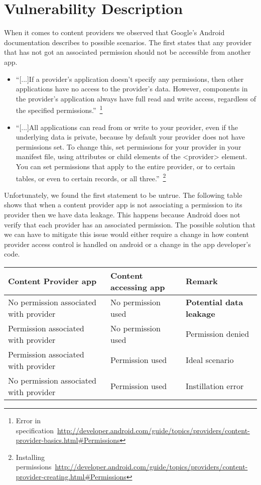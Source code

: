 \section{Vulnerability Description}
\label{vuln}
When it comes to content providers we observed that Google's Android documentation describes to possible scenarios. The first states that any provider that has not got an associated permission should not be accessible from another app.
\begin{itemize}
	\item ``[...]If a provider's application doesn't specify any permissions, then other applications have no access to the provider's data. However, components in the provider's application always have full read and write access, regardless of the specified permissions.''~\footnote{Error in specification~\url{http://developer.android.com/guide/topics/providers/content-provider-basics.html#Permissions}}
	\item ``[...]All applications can read from or write to your provider, even if the underlying data is private, because by default your provider does not have permissions set. To change this, set permissions for your provider in your manifest file, using attributes or child elements of the <provider> element. You can set permissions that apply to the entire provider, or to certain tables, or even to certain records, or all three.''~\footnote{Installing permissions~\url{http://developer.android.com/guide/topics/providers/content-provider-creating.html#Permissions}}
\end{itemize}

Unfortunately, we found the first statement to be untrue. The following table shows that when a content provider app is not associating a permission to its provider then we have data leakage. This happens because Android does not verify that each provider has an associated permission. The possible solution that we can have to mitigate this issue would either require a change in how content provider access control is handled on android or a change in the app developer's code. 
\begin{center}
	\begin{tabular}{ | p{2.5cm} | p{2.5cm} | p{2cm} | }
		\hline
		\textbf{Content Provider app} & \textbf{Content accessing app} & \textbf{Remark} \\
		\hline \hline
		No permission associated with provider & No permission used & \textcolor[rgb]{0.55,0,0}{\textbf{Potential data leakage}} \\
		\hline
		Permission associated with provider & No permission used & Permission denied \\
		\hline
		Permission associated with provider & Permission used & \textcolor[rgb]{0,0.33,0}{Ideal scenario} \\
		\hline
		No permission associated with provider & Permission used & Instillation error \\
		\hline
	\end{tabular}
\end{center}